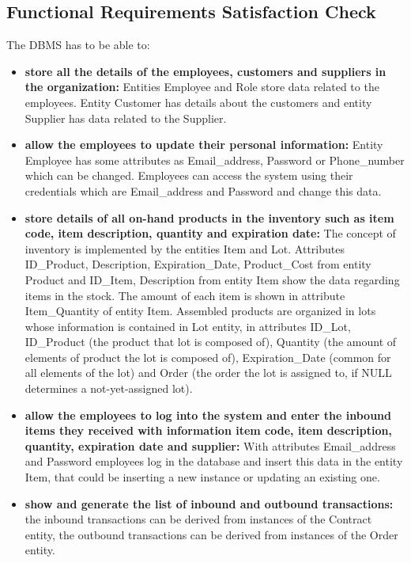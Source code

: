 \subsection{Functional Requirements Satisfaction Check}

The DBMS has to be able to:
\begin{itemize}
	\item \textbf{store all the details of the employees, customers and suppliers in the organization:} Entities Employee and Role store data related to the employees. Entity Customer has details about the customers and entity Supplier has data related to the Supplier.
	\item \textbf{allow the employees to update their personal information:} Entity Employee has some attributes as Email\_address, Password or Phone\_number which can be changed. Employees can access the system using their credentials which are Email\_address and Password and change this data.
	\item \textbf{store details of all on-hand products in the inventory such as item code, item description, quantity and expiration date:} The concept of inventory is implemented by the entities Item and Lot. Attributes ID\_Product, Description, Expiration\_Date, Product\_Cost from entity Product and ID\_Item, Description from entity Item show the data regarding items in the stock. The amount of each item is shown in attribute Item\_Quantity of entity Item. Assembled products are organized in lots whose information is contained in Lot entity, in attributes ID\_Lot, ID\_Product (the product that lot is composed of), Quantity (the amount of elements of product the lot is composed of), Expiration\_Date (common for all elements of the lot) and Order (the order the lot is assigned to, if NULL determines a not-yet-assigned lot).  
	\item \textbf{allow the employees to log into the system and enter the inbound items they received with information item code, item description, quantity, expiration date and supplier:} With attributes Email\_address and Password employees log in the database and insert this data in the entity Item, that could be inserting a new instance or updating an existing one.
	\item \textbf{show and generate the list of inbound and outbound transactions:} the inbound transactions can be derived from instances of the Contract entity, the outbound transactions can be derived from instances of the Order entity.

\end{itemize}
